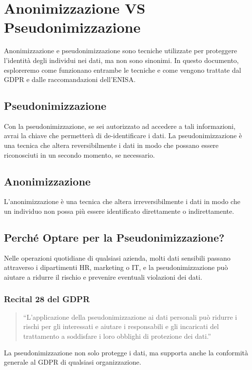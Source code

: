 \chapter{Anonimizzazione VS Pseudonimizzazione}

Anonimizzazione e pseudonimizzazione sono tecniche utilizzate per proteggere l'identità degli individui nei dati, ma non sono sinonimi. In questo documento, esploreremo come funzionano entrambe le tecniche e come vengono trattate dal GDPR e dalle raccomandazioni dell'ENISA.

\section{Pseudonimizzazione}
Con la pseudonimizzazione, se sei autorizzato ad accedere a tali informazioni, avrai la chiave che permetterà di de-identificare i dati. La pseudonimizzazione è una tecnica che altera reversibilmente i dati in modo che possano essere riconosciuti in un secondo momento, se necessario.

\section{Anonimizzazione}
L'anonimizzazione è una tecnica che altera irreversibilmente i dati in modo che un individuo non possa più essere identificato direttamente o indirettamente. 

\newpage

\section{Perché Optare per la Pseudonimizzazione?}
Nelle operazioni quotidiane di qualsiasi azienda, molti dati sensibili passano attraverso i dipartimenti HR, marketing o IT, e la pseudonimizzazione può aiutare a ridurre il rischio e prevenire eventuali violazioni dei dati.

\subsection{Recital 28 del GDPR}
\begin{quote}
“L'applicazione della pseudonimizzazione ai dati personali può ridurre i rischi per gli interessati e aiutare i responsabili e gli incaricati del trattamento a soddisfare i loro obblighi di protezione dei dati.”
\end{quote}

La pseudonimizzazione non solo protegge i dati, ma supporta anche la conformità generale al GDPR di qualsiasi organizzazione.

